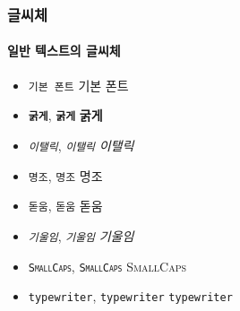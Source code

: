   \begin{frame}[fragile]
    \frametitle{글씨체}
    \framesubtitle{일반 텍스트의 글씨체}
    \begin{itemize}
      \item \texttt{{\normalfont 기본 폰트}} {\normalfont 기본 폰트}
      \item \texttt{\textbf{굵게}}, \texttt{{\bfseries 굵게}} \textbf{굵게}
      \item \texttt{\textit{이탤릭}}, \texttt{{\itshape 이탤릭}} \textit{이탤릭}
      \item \texttt{\textrm{명조}}, \texttt{{\rmfamily 명조}} \textrm{명조}
      \item \texttt{\textsf{돋움}}, \texttt{{\sffamily 돋움}} \textsf{돋움}
      \item \texttt{\textsl{기울임}}, \texttt{{\slshape 기울임}} \textsl{기울임}
      \item \texttt{\textsc{SmallCaps}}, \texttt{{\scshape SmallCaps}} \textsc{SmallCaps}
      \item \texttt{\texttt{typewriter}}, \texttt{{\ttfamily typewriter}} \texttt{typewriter}
    \end{itemize}
  \end{frame}
  
